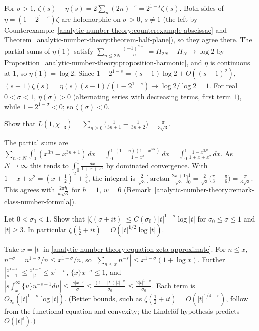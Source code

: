 \begin{solution}
For $\sigma > 1$, $\zeta(s) - \eta(s) = 2\sum_n(2n)^{-s} = 2^{1-s}\zeta(s)$. Both sides of $\eta = (1 - 2^{1-s})\zeta$ are holomorphic on $\sigma > 0$, $s \neq 1$ (the left by
Counterexample~\ref{analytic-number-theory:counterexample-abscissae} and Theorem~\ref{analytic-number-theory:theorem-half-plane}), so they agree there. The partial sums of $\eta(1)$ satisfy
$\sum_{n \leq 2N}\frac{(-1)^{n-1}}{n} = H_{2N} - H_N \to \log 2$ by Proposition~\ref{analytic-number-theory:proposition-harmonic}, and $\eta$ is continuous at $1$, so $\eta(1) = \log 2$. Since
$1 - 2^{1-s} = (s - 1)\log 2 + O((s - 1)^2)$, $(s - 1)\zeta(s) = \eta(s)(s - 1)/(1 - 2^{1-s}) \to \log 2/\log 2 = 1$. For real $0 < \sigma < 1$, $\eta(\sigma) > 0$ (alternating series with decreasing terms,
first term $1$), while $1 - 2^{1-\sigma} < 0$; so $\zeta(\sigma) < 0$.
\end{solution}

\begin{exercise}\label{analytic-number-theory:exercise-l-minus-three}
Show that $L(1, \chi_{-3}) = \sum_{n \geq 0}\bigl(\frac{1}{3n + 1} - \frac{1}{3n + 2}\bigr) = \frac{\pi}{3\sqrt3}$.
\end{exercise}

\begin{solution}
The partial sums are $\sum_{n < N}\int_0^1(x^{3n} - x^{3n+1})\,dx = \int_0^1\frac{(1 - x)(1 - x^{3N})}{1 - x^3}\,dx = \int_0^1\frac{1 - x^{3N}}{1 + x + x^2}\,dx$. As $N \to \infty$ this tends to
$\int_0^1\frac{dx}{1 + x + x^2}$ by dominated convergence. With $1 + x + x^2 = (x + \frac12)^2 + \frac34$, the integral is
$\frac{2}{\sqrt3}\bigl[\arctan\frac{2x + 1}{\sqrt3}\bigr]_0^1 = \frac{2}{\sqrt3}\bigl(\frac\pi3 - \frac\pi6\bigr) = \frac{\pi}{3\sqrt3}$. This agrees with $\frac{2\pi h}{w\sqrt3}$ for $h = 1$, $w = 6$
(Remark~\ref{analytic-number-theory:remark-class-number-formula}).
\end{solution}

\begin{exercise}\label{analytic-number-theory:exercise-zeta-strip-bound}
Let $0 < \sigma_0 < 1$. Show that $|\zeta(\sigma + it)| \leq C(\sigma_0)|t|^{1-\sigma}\log|t|$ for $\sigma_0 \leq \sigma \leq 1$ and $|t| \geq 3$. In particular $\zeta(\frac12 + it) = O(|t|^{1/2}\log|t|)$.
\end{exercise}

\begin{solution}
Take $x = |t|$ in \eqref{analytic-number-theory:equation-zeta-approximate}. For $n \leq x$, $n^{-\sigma} = n^{1-\sigma}/n \leq x^{1-\sigma}/n$, so $|\sum_{n \leq x}n^{-s}| \leq x^{1-\sigma}(1 + \log x)$. Further
$|\frac{x^{1-s}}{s - 1}| \leq \frac{x^{1-\sigma}}{|t|} \leq x^{1-\sigma}$, $\{x\}x^{-\sigma} \leq 1$, and $|s\int_x^\infty\{u\}u^{-s-1}du| \leq \frac{|s|x^{-\sigma}}{\sigma} \leq \frac{(1 + |t|)|t|^{-\sigma}}{\sigma_0} \leq \frac{2|t|^{1-\sigma}}{\sigma_0}$.
Each term is $O_{\sigma_0}(|t|^{1-\sigma}\log|t|)$. (Better bounds, such as $\zeta(\frac12 + it) = O(|t|^{1/4 + \varepsilon})$, follow from the functional equation and convexity; the Lindelöf hypothesis predicts
$O(|t|^\varepsilon)$.)
\end{solution}

